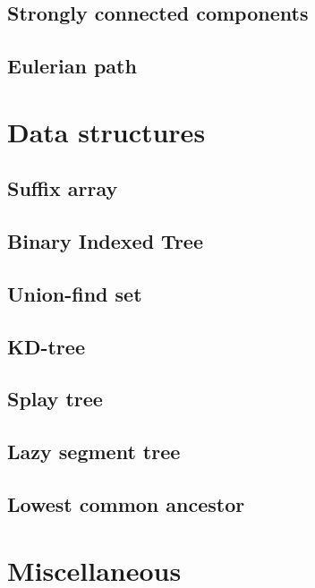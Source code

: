 \documentclass[twocolumn]{article}
\begin{document}
\subsection{Strongly connected components}

\subsection{Eulerian path}


\section{Data structures}
\subsection{Suffix array}

\subsection{Binary Indexed Tree}

\subsection{Union-find set}

\subsection{KD-tree}

\subsection{Splay tree}

\subsection{Lazy segment tree}

\subsection{Lowest common ancestor}


\section{Miscellaneous}
\end{document}
